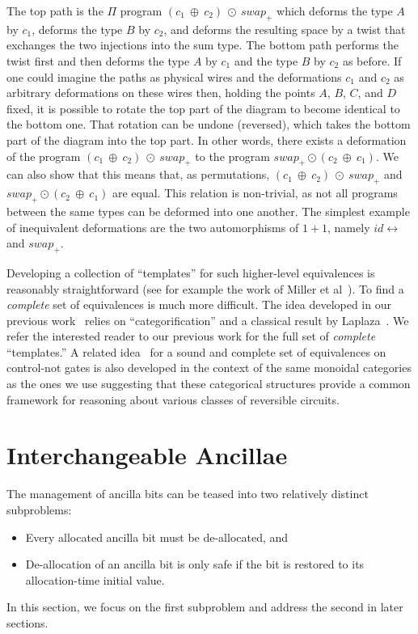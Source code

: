 \documentclass[sigplan,10pt,review,anonymous]{acmart}
\newcommand{\swapp}{\mathit{swap}_+}
\newcommand{\idc}{\mathit{id}\!\!\leftrightarrow}
\begin{document}
\noindent The top path is the $\Pi$ program
$(c_1~\oplus~c_2)~\odot~\swapp$ which deforms the type $A$ by $c_1$,
deforms the type $B$ by $c_2$, and deforms the resulting space by a
twist that exchanges the two injections into the sum type. The bottom
path performs the twist first and then deforms the type $A$ by $c_1$
and the type $B$ by $c_2$ as before. If one could imagine the paths
  as physical wires and the deformations $c_1$ and $c_2$ as arbitrary
deformations on these wires then, holding the points $A$, $B$, $C$,
and $D$ fixed, it is possible to rotate the top part of the diagram to
become identical to the bottom one. That rotation can be undone
(reversed), which takes the bottom part of the diagram into the top
part.  In other words, there exists a deformation of the program
$(c_1~\oplus~c_2)~\odot~\swapp$ to the program
$\swapp \odot (c_2~\oplus~c_1)$. We can also show that this means
that, as permutations, $(c_1~\oplus~c_2)~\odot~\swapp$ and
$\swapp \odot (c_2~\oplus~c_1)$ are equal. This relation is
non-trivial, as not all programs between the same types can be
deformed into one another. The simplest example of inequivalent
deformations are the two automorphisms of $1+1$, namely $\idc$ and
$\swapp$.

Developing a collection of ``templates'' for such higher-level
equivalences is reasonably straightforward (see for example the work
of Miller et al~\cite{Miller:2003:TBA:775832.775915}). To find a
\emph{complete} set of equivalences is much more difficult. The idea
developed in our previous work~\cite{DBLP:conf/esop/CaretteS16} relies
on ``categorification'' and a classical result by
Laplaza~\cite{laplaza}. We refer the interested reader to our previous
work for the full set of \emph{complete} ``templates.'' A related
idea~\cite{DBLP:journals/corr/CockettCS17} for a sound and complete
set of equivalences on control-not gates is also developed in the
context of the same monoidal categories as the ones we use suggesting
that these categorical structures provide a common framework for
reasoning about various classes of reversible circuits.

\section{Interchangeable Ancillae}

The management of ancilla bits can be teased into two relatively
distinct subproblems:
\begin{itemize}
\item Every allocated ancilla bit must be de-allocated, and 
\item De-allocation of an ancilla bit is only safe if the bit is
  restored to its allocation-time initial value.
\end{itemize}
In this section, we focus on the first subproblem and address the
second in later sections.
\end{document}
